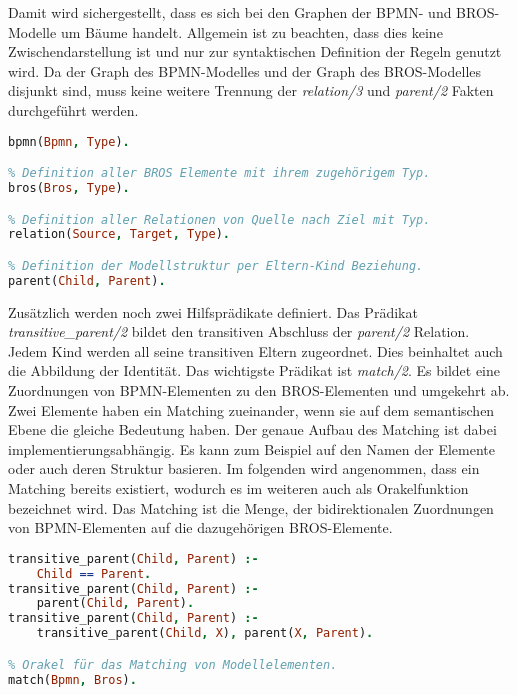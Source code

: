 Damit wird sichergestellt, dass es sich bei den Graphen der BPMN- und BROS-Modelle um Bäume handelt.
Allgemein ist zu beachten, dass dies keine Zwischendarstellung ist und nur zur syntaktischen Definition der Regeln genutzt wird.
Da der Graph des BPMN-Modelles und der Graph des BROS-Modelles disjunkt sind, muss keine weitere Trennung der \emph{relation/3} und \emph{parent/2} Fakten durchgeführt werden.

\begin{lstlisting}[language=Prolog, caption=Definitionen der Faktenbasis, label=lst:definition_facts]
% Definition aller BPMN Elemente mit ihrem zugehörigem Typ.
bpmn(Bpmn, Type).

% Definition aller BROS Elemente mit ihrem zugehörigem Typ.
bros(Bros, Type).

% Definition aller Relationen von Quelle nach Ziel mit Typ.
relation(Source, Target, Type).

% Definition der Modellstruktur per Eltern-Kind Beziehung.
parent(Child, Parent).
\end{lstlisting}

Zusätzlich werden noch zwei Hilfsprädikate definiert.
Das Prädikat \emph{transitive\_parent/2} bildet den transitiven Abschluss der \emph{parent/2} Relation.
Jedem Kind werden all seine transitiven Eltern zugeordnet.
Dies beinhaltet auch die Abbildung der Identität.
Das wichtigste Prädikat ist \emph{match/2}.
Es bildet eine Zuordnungen von BPMN-Elementen zu den BROS-Elementen und umgekehrt ab.
Zwei Elemente haben ein Matching zueinander, wenn sie auf dem semantischen Ebene die gleiche Bedeutung haben.
Der genaue Aufbau des Matching ist dabei implementierungsabhängig.
Es kann zum Beispiel auf den Namen der Elemente oder auch deren Struktur basieren.
Im folgenden wird angenommen, dass ein Matching bereits existiert, wodurch es im weiteren auch als Orakelfunktion bezeichnet wird.
Das Matching ist die Menge, der bidirektionalen Zuordnungen von BPMN-Elementen auf die dazugehörigen BROS-Elemente. 

\begin{lstlisting}[language=Prolog, caption=Definitionen der weiterführenden Regeln, label=lst:definition_predicats]
% Transitiver Abschluss der Modellstruktur.
transitive_parent(Child, Parent) :- 
    Child == Parent.
transitive_parent(Child, Parent) :- 
    parent(Child, Parent).
transitive_parent(Child, Parent) :- 
    transitive_parent(Child, X), parent(X, Parent).

% Orakel für das Matching von Modellelementen.
match(Bpmn, Bros).
\end{lstlisting}

